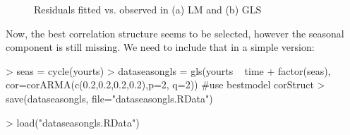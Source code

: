 \documentclass[11pt, a4paper]{article} %
\begin{document}
\begin{figure}[ht]
\begin{center}
\qquad
{}
\end{center}
\caption{Residuals fitted vs. observed in (a) LM and (b) GLS}
\label{residual}
\end{figure}

\noindent Now, the best correlation structure seems to be selected, however the seasonal component is still missing. We need to include that in a simple version: 


\begin{Schunk}
\begin{Sinput}
> seas = cycle(yourts)
> dataseasongls = gls(yourts ~ time + factor(seas), cor=corARMA(c(0.2,0.2,0.2,0.2),p=2, q=2)) #use bestmodel corStruct
> save(dataseasongls, file="dataseasongls.RData")
\end{Sinput}
\end{Schunk}

\begin{Schunk}
\begin{Sinput}
> load("dataseasongls.RData")
\end{Sinput}
\end{Schunk}
\end{document}
